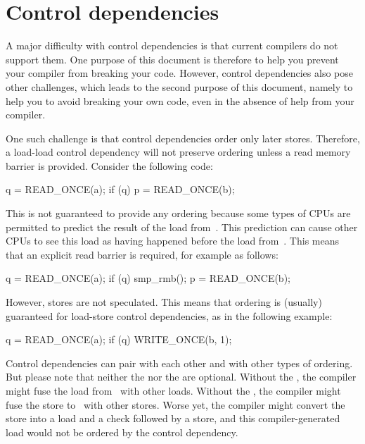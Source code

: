\section{Control dependencies}

A major difficulty with control dependencies is that current compilers
do not support them.
One purpose of this document is therefore to help you prevent your
compiler from breaking your code.
However, control dependencies also pose other challenges, which leads to the
second purpose of this document, namely to help you to avoid breaking
your own code, even in the absence of help from your compiler.

One such challenge is that control dependencies order only later stores.
Therefore, a load-load control dependency will not preserve ordering
unless a read memory barrier is provided.
Consider the following code:

\begin{VerbatimU}
	q = READ_ONCE(a);
	if (q)
		p = READ_ONCE(b);
\end{VerbatimU}

This is not guaranteed to provide any ordering because some types of CPUs
are permitted to predict the result of the load from~.
This prediction can cause other CPUs to see this load as having happened
before the load from~.
This means that an explicit read barrier is required, for example as follows:

\begin{VerbatimU}
	q = READ_ONCE(a);
	if (q) {
		smp_rmb();
		p = READ_ONCE(b);
	}
\end{VerbatimU}

However, stores are not speculated.
This means that ordering is (usually) guaranteed for load-store control
dependencies, as in the following example:

\begin{VerbatimU}
	q = READ_ONCE(a);
	if (q)
		WRITE_ONCE(b, 1);
\end{VerbatimU}

Control dependencies can pair with each other and with other types
of ordering.
But please note that neither the  nor the 
are optional.
Without the , the compiler might fuse the load from~
with other loads.
Without the , the compiler might fuse the store to~
with other stores.
Worse yet, the compiler might convert the store into a load and a check followed
by a store, and this compiler-generated load would not be ordered by
the control dependency.

